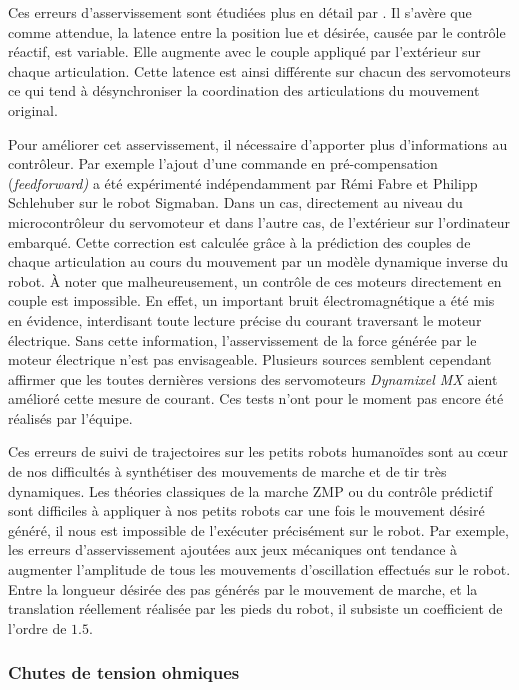 Ces erreurs d'asservissement sont étudiées plus en détail par \cite{DynabanRoboCup2016}.
Il s'avère que comme attendue, la latence entre la position lue et désirée,
causée par le contrôle réactif, est variable.
Elle augmente avec le couple appliqué par l'extérieur sur chaque articulation.
Cette latence est ainsi différente sur chacun des servomoteurs ce qui
tend à désynchroniser la coordination des articulations du mouvement original.

Pour améliorer cet asservissement, il nécessaire d'apporter plus
d'informations au contrôleur.
Par exemple l'ajout d'une commande en pré-compensation (\textit{feedforward)}
a été expérimenté indépendamment par Rémi Fabre et Philipp Schlehuber
sur le robot Sigmaban. 
Dans un cas, directement au niveau du microcontrôleur
du servomoteur et dans l'autre cas, de l'extérieur sur l'ordinateur embarqué.
Cette correction est calculée grâce à la prédiction des couples
de chaque articulation au cours du mouvement par un modèle dynamique 
inverse du robot.
À noter que malheureusement, un contrôle de ces moteurs directement 
en couple est impossible. 
En effet, un important bruit électromagnétique a été mis en évidence, 
interdisant toute lecture précise du courant traversant
le moteur électrique. Sans cette information, l'asservissement
de la force générée par le moteur électrique n'est pas envisageable.
Plusieurs sources semblent cependant affirmer que les toutes dernières
versions des servomoteurs \textit{Dynamixel MX} aient amélioré cette mesure
de courant. Ces tests n'ont pour le moment pas encore été réalisés par l'équipe.

Ces erreurs de suivi de trajectoires sur les petits robots humanoïdes
sont au cœur de nos difficultés à synthétiser des mouvements de marche
et de tir très dynamiques.
Les théories classiques de la marche ZMP ou du contrôle prédictif sont difficiles
à appliquer à nos petits robots car une fois le mouvement désiré généré, il nous 
est impossible de l'exécuter précisément sur le robot.
Par exemple, les erreurs d'asservissement ajoutées aux jeux mécaniques ont tendance
à augmenter l'amplitude de tous les mouvements d'oscillation effectués sur le robot.
Entre la longueur désirée des pas générés par le mouvement de marche, et la translation 
réellement réalisée par les pieds du robot, il subsiste un coefficient de l'ordre de $1.5$.

\subsubsection{Chutes de tension ohmiques}

